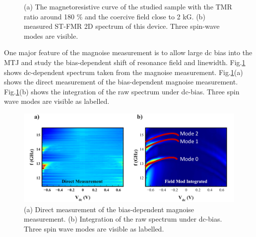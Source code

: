 \begin{figure}[!ht]
\centering
{}
\caption{(a) The magnetoresistive curve of the studied sample with the TMR ratio around 180 \% and the coercive field close to 2 kG. (b) measured ST-FMR 2D spectrum of this device. Three spin-wave modes are visible.}
\end{figure}

One major feature of the magnoise measurement is to allow large dc bias into the MTJ and study the bias-dependent shift of resonance field and linewidth. Fig.\ref{fig:magnoise-2D} shows dc-dependent spectrum taken from the magnoise measurement. Fig.\ref{fig:magnoise-2D}(a) shows the direct measurement of the bias-dependent magnoise measurement. Fig.\ref{fig:magnoise-2D}(b) shows the integration of the raw spectrum under dc-bias. Three spin wave modes are visible as labelled. 

\begin{figure}[!ht]
  \centering
  \includegraphics[width=1.0\textwidth]{fig/magnoise/magnoise2D.png}
   \caption{(a) Direct measurement of the bias-dependent magnoise measurement. (b) Integration of the raw spectrum under dc-bias. Three spin wave modes are visible as labelled. }
  \label{fig:magnoise-2D}
\end{figure}

